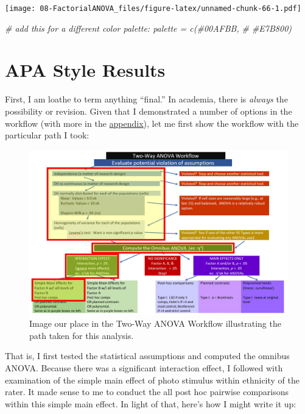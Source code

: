 \documentclass[
  11pt,
]{book}
\newenvironment{Shaded}{\begin{snugshade}}{\end{snugshade}}
\newcommand{\CommentTok}[1]{\textcolor[rgb]{0.37,0.37,0.37}{\textit{#1}}}
\begin{document}
\texttt{[image: 08-FactorialANOVA\_files/figure-latex/unnamed-chunk-66-1.pdf]}

\begin{Shaded}
\begin{Highlighting}[]
\CommentTok{\# add this for a different color palette: palette = c(\textquotesingle{}\#00AFBB\textquotesingle{},}
\CommentTok{\# \textquotesingle{}\#E7B800\textquotesingle{})}
\end{Highlighting}
\end{Shaded}

\hypertarget{apa-style-results-4}{%
\section{APA Style Results}\label{apa-style-results-4}}

First, I am loathe to term anything ``final.'' In academia, there is \emph{always} the possibility or revision. Given that I demonstrated a number of options in the workflow (with more in the \protect\hyperlink{moRe}{appendix}), let me first show the workflow with the particular path I took:

\begin{figure}
\centering
\includegraphics{images/factorial/WrkFlw_mypath.jpg}
\caption{Image our place in the Two-Way ANOVA Workflow illustrating the path taken for this analysis.}
\end{figure}

That is, I first tested the statistical assumptions and computed the omnibus ANOVA. Because there was a significant interaction effect, I followed with examination of the simple main effect of photo stimulus within ethnicity of the rater. It made sense to me to conduct the all post hoc pairwise comparisons within this simple main effect. In light of that, here's how I might write it up:
\end{document}
